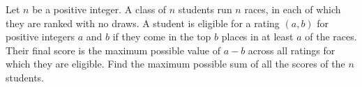 Let $n$ be a positive integer. A class of $n$ students run $n$ races, in each of which they are ranked with no draws. A student is eligible for a rating $(a, b)$ for positive integers $a$ and $b$ if they come in the top $b$ places in at least $a$ of the races. Their final score is the maximum possible value of $a - b$ across all ratings for which they are eligible. Find the maximum possible sum of all the scores of the $n$ students.
